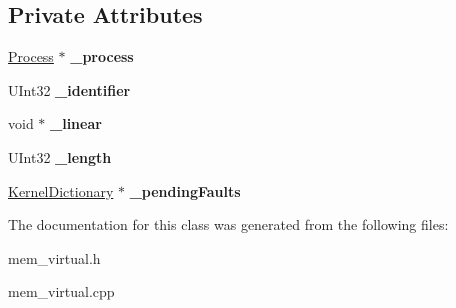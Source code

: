 \subsection*{Private Attributes}
\begin{DoxyCompactItemize}
\item 
\mbox{\label{class_virtual_memory_a5b11cb532722f0495dee782dfb48e18f}} 
\hyperlink{class_process}{Process} $\ast$ {\bfseries \+\_\+process}
\item 
\mbox{\label{class_virtual_memory_ae2b494aa62bc2130771f2c46bf87f0dc}} 
U\+Int32 {\bfseries \+\_\+identifier}
\item 
\mbox{\label{class_virtual_memory_a09d38b6d4a990635137e22e1ecf0ead6}} 
void $\ast$ {\bfseries \+\_\+linear}
\item 
\mbox{\label{class_virtual_memory_af506ecb4ef9dfaeab3a1bf85a8bbd975}} 
U\+Int32 {\bfseries \+\_\+length}
\item 
\mbox{\label{class_virtual_memory_adbcb31638eb77ac095b9570ca96dac1b}} 
\hyperlink{class_kernel_dictionary}{Kernel\+Dictionary} $\ast$ {\bfseries \+\_\+pending\+Faults}
\end{DoxyCompactItemize}


The documentation for this class was generated from the following files\+:\begin{DoxyCompactItemize}
\item 
mem\+\_\+virtual.\+h\item 
mem\+\_\+virtual.\+cpp\end{DoxyCompactItemize}
